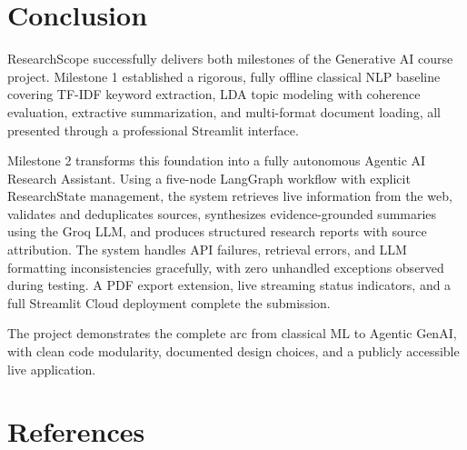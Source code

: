 \documentclass[12pt, a4paper]{article}
\begin{document}
\section{Conclusion}

ResearchScope successfully delivers both milestones of the Generative AI course project. Milestone 1 established a rigorous, fully offline classical NLP baseline covering TF-IDF keyword extraction, LDA topic modeling with coherence evaluation, extractive summarization, and multi-format document loading, all presented through a professional Streamlit interface.

Milestone 2 transforms this foundation into a fully autonomous Agentic AI Research Assistant. Using a five-node LangGraph workflow with explicit ResearchState management, the system retrieves live information from the web, validates and deduplicates sources, synthesizes evidence-grounded summaries using the Groq LLM, and produces structured research reports with source attribution. The system handles API failures, retrieval errors, and LLM formatting inconsistencies gracefully, with zero unhandled exceptions observed during testing. A PDF export extension, live streaming status indicators, and a full Streamlit Cloud deployment complete the submission.

The project demonstrates the complete arc from classical ML to Agentic GenAI, with clean code modularity, documented design choices, and a publicly accessible live application.

\section*{References}
\end{document}

